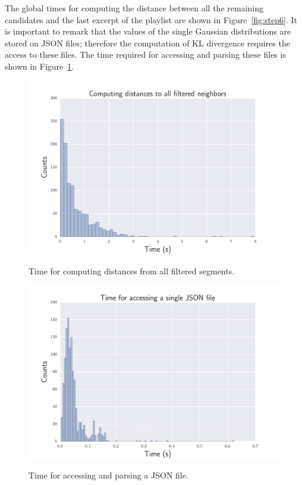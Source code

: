 The global times for computing the distance between all the remaining candidates and the last excerpt of the playlist are shown in Figure~\ref{fig:step6}. It is important to remark that the values of the single Gaussian distributions are stored on JSON files; therefore the computation of KL divergence requires the access to these files. The time required for accessing and parsing these files is shown in Figure~\ref{fig:step8}.
\begin{figure}[htbp]
\begin{center}
\includegraphics[scale=0.6]{Figures/bench_get_suitsegm.pdf}
  \caption[Time for computing distances from all filtered segments]{Time for computing distances from all filtered segments.}
  \label{fig:step6}
\vspace{1cm}
\includegraphics[scale=0.6]{Figures/bench_json_single.pdf}
  \caption[Time for accessing and parsing a JSON file]{Time for accessing and parsing a JSON file.}
  \label{fig:step8}
\end{center}
\end{figure}


